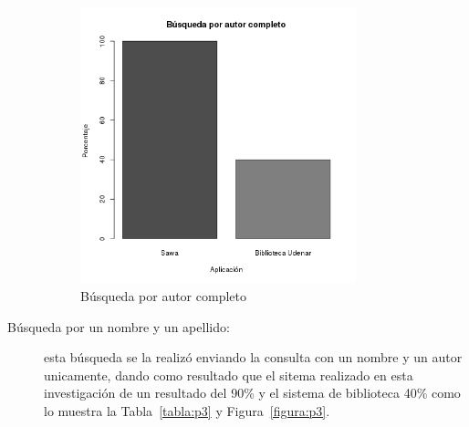 \begin{description}
 \begin{figure}[!ht]
\begin{center}
\includegraphics[width=8cm]{pictures/p2.png}
\end{center}
\caption{Búsqueda por autor completo} \label{figura:p2}
\end{figure}
 
 \newpage
 \item [Búsqueda por un nombre y un apellido:] esta búsqueda se la realizó enviando la consulta
 con un nombre y un autor unicamente, dando como resultado que el sitema realizado
 en esta investigación de un resultado del 90\% y el sistema de biblioteca 40\% como lo muestra la Tabla~\ref{tabla:p3} y Figura~\ref{figura:p3}.
 
  \begin{center}
\begin{table}[!ht]
\caption{Búsqueda por un nombre y un apellido} \label{tabla:p3}
\end{table}
\end{center}
 

\end{description}
